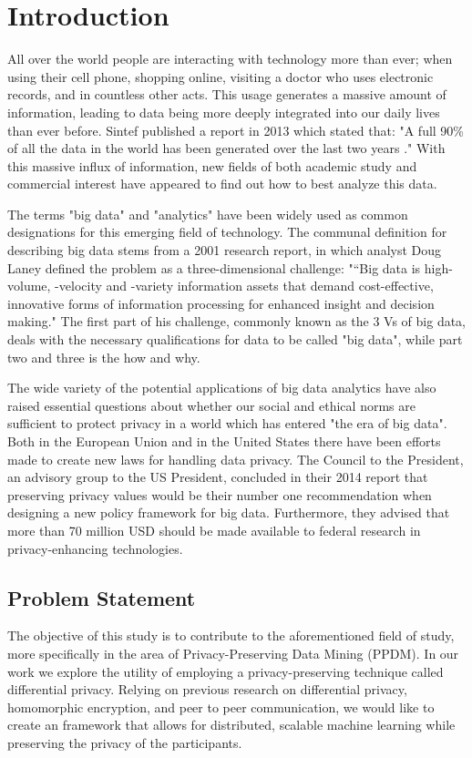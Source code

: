 
\chapter{Introduction}
All over the world people are interacting with technology more than ever; when using their cell phone, shopping online, visiting a doctor who uses electronic records, and in countless other acts. This usage generates a massive amount of information, leading to data being more deeply integrated into our daily lives than ever before. Sintef published a report in 2013 which stated that: "A full 90\% of all the data in the world has been generated over the last two years \citep{dragland2013big}." With this massive influx of information, new fields of both academic study and commercial interest have appeared to find out how to best analyze this data. 

The terms "big data" and "analytics" have been widely used as common designations for this emerging field of technology. The communal definition for describing big data stems from a 2001 research report\citep{laney2001dataVs}, in which analyst Doug Laney defined the problem as a three-dimensional challenge: "“Big data is high-volume, -velocity and -variety information assets that demand cost-effective, innovative forms of information processing for enhanced insight and decision making." The first part of his challenge, commonly known as the 3 Vs of big data, deals with the necessary qualifications for data to be called "big data", while part two and three is the how and why.  
   
The wide variety of the potential applications of big data analytics have also raised essential questions about whether our social and ethical norms are sufficient to protect privacy in a world which has entered "the era of big data". Both in the European Union and in the United States there have been efforts made to create new laws for handling data privacy. The Council to the President, an advisory group to the US President, concluded in their 2014 report \citep{house2014bigdata} that preserving privacy values would be their number one recommendation when designing a new policy framework for big data. Furthermore, they advised that more than 70 million USD should be made available to federal research in privacy-enhancing technologies. 

\section{Problem Statement}
\label{sec:problem_statement}
The objective of this study is to contribute to the aforementioned field of study, more specifically in the area of Privacy-Preserving Data Mining (PPDM). In our work we explore the utility of employing a privacy-preserving technique called differential privacy. Relying on previous research on differential privacy, homomorphic encryption, and peer to peer communication, we would like to create an framework that allows for distributed, scalable machine learning while preserving the privacy of the participants. 

